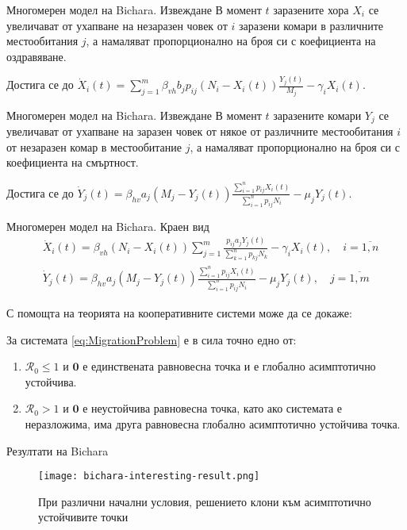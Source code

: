 \begin{frame}[t]{Многомерен модел на Bichara. Извеждане}
  В момент $t$ заразените хора $X_i$ се увеличават от ухапване на незаразен човек от $i$ заразени комари в различните местообитания $j$, а намаляват пропорционално на броя си с коефициента на оздравяване.

  Достига се до $\dot{X}_i(t) = \sum_{j=1}^{m} \beta_{vh} b_j p_{ij} (N_i - X_i(t)) \frac{Y_j(t)}{M_j} - \gamma_i X_i(t)$.
\end{frame}

\begin{frame}[t]{Многомерен модел на Bichara. Извеждане}
  В момент $t$ заразените комари $Y_j$ се увеличават от ухапване на заразен човек от някое от различните местообитания $i$ от незаразен комар в местообитание $j$, а намаляват пропорционално на броя си с коефициента на смъртност.

  Достига се до $\dot{Y}_j(t) = \beta_{hv} a_j (M_j - Y_j(t)) \frac{\sum_{i=1}^n p_{ij} X_i(t)}{\sum_{i=1}^n p_{ij} N_i} - \mu_j Y_j(t)$.
\end{frame}

\begin{frame}[t]{Многомерен модел на Bichara. Краен вид}
  \begin{equation}
    \label{eq:MigrationProblem}
    \begin{split}
      &\dot{X}_i(t) = \beta_{vh} (N_i - X_i(t)) \sum_{j=1}^{m} \frac{p_{ij} a_j Y_j(t)}{\sum_{k=1}^n p_{kj} N_k} - \gamma_i X_i(t), \quad i=\overline{1, n} \\
      &\dot{Y}_j(t) = \beta_{hv} a_j (M_j - Y_j(t)) \frac{\sum_{i=1}^n p_{ij} X_i(t)}{\sum_{i=1}^n p_{ij} N_i} - \mu_j Y_j(t), \quad j=\overline{1, m}
    \end{split}
  \end{equation}

  С помощта на теорията на кооперативните системи може да се докаже:
  \begin{proposition}
    За системата \ref{eq:MigrationProblem} е в сила точно едно от:
    \begin{enumerate}
      \item $\mathscr{R}_0 \leq 1$ и $\boldsymbol{0}$ е единствената равновесна точка и е глобално асимптотично устойчива.
      \item $\mathscr{R}_0 > 1$ и $\boldsymbol{0}$ е неустойчива равновесна точка, като ако системата е неразложима, има друга равновесна глобално асимптотично устойчива точка.
    \end{enumerate}
  \end{proposition}
\end{frame}

\begin{frame}[t]{Резултати на Bichara}
  \begin{figure}[h]
    \centering
    \texttt{[image: bichara-interesting-result.png]}
    \caption{При различни начални условия, решението клони към асимптотично устойчивите точки}
  \end{figure}
\end{frame}
